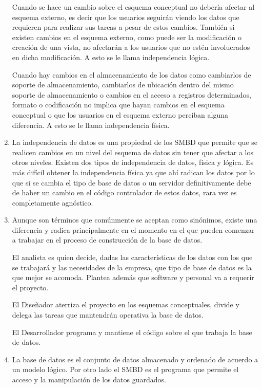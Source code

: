 \documentclass{exam}
\begin{document}
\begin{questions}
\begin{enumerate}[label=\alph*.]
		Cuando se hace un cambio sobre el esquema conceptual no debería afectar al esquema externo, es decir que los usuarios seguirán viendo los datos que requieren para realizar sus tareas a pesar de estos cambios. También si existen cambios en el esquema externo, como puede ser la modificación o creación de una vista, no afectarán a los usuarios que no estén involucrados en dicha modificación. A esto se le llama independencia lógica.
		
		Cuando hay cambios en el almacenamiento de los datos como cambiarlos de soporte de almacenamiento, cambiarlos de ubicación dentro del mismo soporte de almacenamiento o cambios en el acceso a registros determinados, formato o codificación no implica que hayan cambios en el esquema conceptual o que los usuarios en el esquema externo perciban alguna diferencia. A esto se le llama independencia física.

		\item La independencia de datos es una propiedad de los SMBD que permite que se realicen cambios en un nivel del esquema de datos sin tener que afectar a los otros niveles. Existen dos tipos de independencia de datos, física y lógica. Es más difícil obtener la independencia física ya que ahí radican los datos por lo que si se cambia el tipo de base de datos o un servidor definitivamente debe de haber un cambio en el código controlador de estos datos, rara vez es completamente agnóstico.

		\item Aunque son términos que comúnmente se aceptan como sinónimos, existe una diferencia y radica principalmente en el momento en el que pueden comenzar a trabajar en el proceso de construcción de la base de datos.
		
		El analista es quien decide, dadas las características de los datos con los que se trabajará y las necesidades de la empresa, que tipo de base de datos es la que mejor se acomoda. Plantea además que software y personal va a requerir el proyecto.
		
		El Diseñador aterriza el proyecto en los esquemas conceptuales, divide y delega las tareas que mantendrán operativa la base de datos.
		
		El Desarrollador programa y mantiene el código sobre el que trabaja la base de datos.
		
		\item La base de datos es el conjunto de datos almacenado y ordenado de acuerdo a un modelo lógico. Por otro lado el SMBD es el programa que permite el acceso y la manipulación de los datos guardados.
		

\end{enumerate}
\end{questions}
\end{document}
